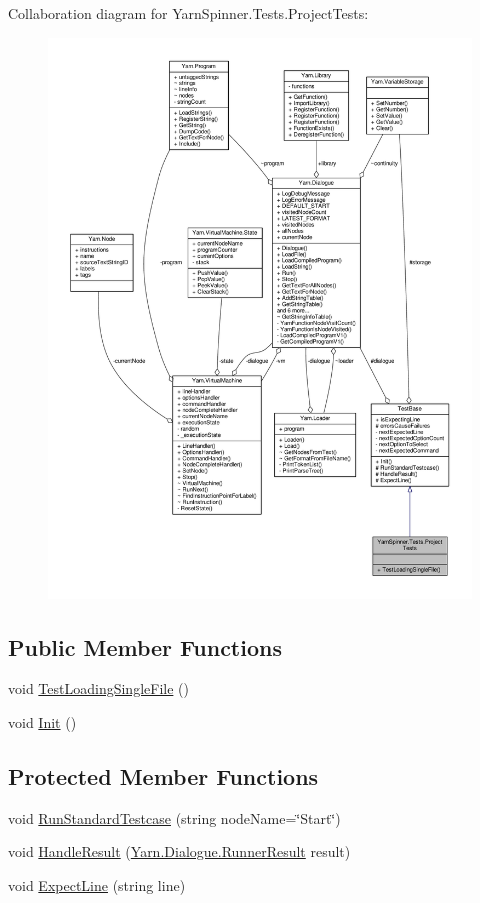 Collaboration diagram for Yarn\-Spinner.\-Tests.\-Project\-Tests\-:
\nopagebreak
\begin{figure}[H]
\begin{center}
\leavevmode
\includegraphics[width=350pt]{dc/d85/a00736}
\end{center}
\end{figure}
\subsection*{Public Member Functions}
\begin{DoxyCompactItemize}
\item 
void \hyperlink{a00128_a7d3dccb3f5ddf0b24e65782b7af15369}{Test\-Loading\-Single\-File} ()
\item 
void \hyperlink{a00144_a357a0dab579f9e45666c10779683dc27}{Init} ()
\end{DoxyCompactItemize}
\subsection*{Protected Member Functions}
\begin{DoxyCompactItemize}
\item 
void \hyperlink{a00144_abffa134d40d72b21e6b35c3bf05fc53f}{Run\-Standard\-Testcase} (string node\-Name=\char`\"{}Start\char`\"{})
\item 
void \hyperlink{a00144_a7b525f85a26d7c942e1cbfa5d6453893}{Handle\-Result} (\hyperlink{a00130}{Yarn.\-Dialogue.\-Runner\-Result} result)
\item 
void \hyperlink{a00144_ac21a5082ddac1da9db17ae54038df44e}{Expect\-Line} (string line)
\end{DoxyCompactItemize}
